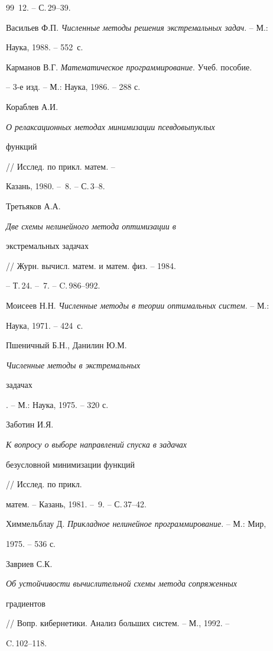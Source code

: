\begin{thebibliography}{99}
\No\,12. -- С.\,29--39.




Васильев Ф.П. {\em Численные методы решения экстремальных задач}. -- М.:


Наука, 1988. -- 552~с.




Карманов В.Г. {\em Математическое программирование}. Учеб. пособие.


-- 3-е изд. -- М.: Наука, 1986. -- 288 с.




Кораблев А.И. {\em О релаксационных методах минимизации псевдовыпуклых


функций} // Исслед. по прикл. матем. --


Казань, 1980. -- \No\,8. -- С.\,3--8.




Третьяков А.А. {\em Две схемы нелинейного метода оптимизации в


экстремальных задачах} // Журн. вычисл. матем. и матем. физ. -- 1984.


-- Т.\,24. -- \No\,7. -- C.\,986--992.




Моисеев Н.Н. {\em Численные методы в теории оптимальных систем}. -- М.:


Наука, 1971. -- 424~с.




Пшеничный Б.Н., Данилин Ю.М. {\em Численные методы в экстремальных


задачах}. -- М.: Наука, 1975. -- 320 с.




Заботин И.Я. {\em К вопросу о выборе направлений спуска в задачах


безусловной минимизации функций} // Исслед. по прикл.


матем. -- Казань, 1981. -- \No\,9. -- С.\,37--42.




Химмельблау Д. {\em Прикладное нелинейное программирование}. -- М.: Мир,


1975. -- 536 с.




Завриев С.К. {\em Об устойчивости вычислительной схемы метода сопряженных


градиентов} // Вопр. кибернетики. Анализ больших систем. -- М., 1992. --


C.\,102--118.



\end{thebibliography}
